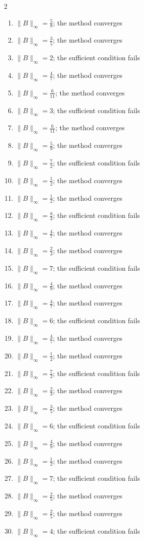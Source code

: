 \begin{multicols}{2}\raggedright
\begin{enumerate}[label=\arabic*., leftmargin=*, itemsep=1pt]
\item $\|B\|_\infty=\frac{5}{8}$; the method converges
\item $\|B\|_\infty=\frac{3}{5}$; the method converges
\item $\|B\|_\infty=2$; the sufficient condition fails
\item $\|B\|_\infty=\frac{4}{7}$; the method converges
\item $\|B\|_\infty=\frac{6}{11}$; the method converges
\item $\|B\|_\infty=3$; the sufficient condition fails
\item $\|B\|_\infty=\frac{6}{11}$; the method converges
\item $\|B\|_\infty=\frac{5}{9}$; the method converges
\item $\|B\|_\infty=\frac{7}{2}$; the sufficient condition fails
\item $\|B\|_\infty=\frac{1}{2}$; the method converges
\item $\|B\|_\infty=\frac{1}{2}$; the method converges
\item $\|B\|_\infty=\frac{8}{3}$; the sufficient condition fails
\item $\|B\|_\infty=\frac{4}{7}$; the method converges
\item $\|B\|_\infty=\frac{2}{3}$; the method converges
\item $\|B\|_\infty=7$; the sufficient condition fails
\item $\|B\|_\infty=\frac{4}{9}$; the method converges
\item $\|B\|_\infty=\frac{4}{7}$; the method converges
\item $\|B\|_\infty=6$; the sufficient condition fails
\item $\|B\|_\infty=\frac{4}{7}$; the method converges
\item $\|B\|_\infty=\frac{1}{2}$; the method converges
\item $\|B\|_\infty=\frac{7}{2}$; the sufficient condition fails
\item $\|B\|_\infty=\frac{2}{3}$; the method converges
\item $\|B\|_\infty=\frac{3}{5}$; the method converges
\item $\|B\|_\infty=6$; the sufficient condition fails
\item $\|B\|_\infty=\frac{4}{9}$; the method converges
\item $\|B\|_\infty=\frac{1}{2}$; the method converges
\item $\|B\|_\infty=7$; the sufficient condition fails
\item $\|B\|_\infty=\frac{2}{5}$; the method converges
\item $\|B\|_\infty=\frac{2}{5}$; the method converges
\item $\|B\|_\infty=4$; the sufficient condition fails
\end{enumerate}
\end{multicols}
